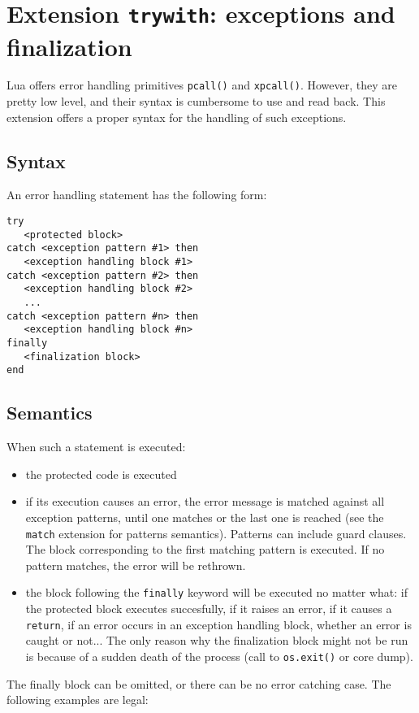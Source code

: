 \section{Extension {\tt trywith}: exceptions and finalization}
Lua offers error handling primitives \verb+pcall()+ and
\verb+xpcall()+. However, they are pretty low level, and their syntax
is cumbersome to use and read back. This extension offers a proper
syntax for the handling of such exceptions.

\subsection{Syntax}
An error handling statement has the following form:

\begin{verbatim}
try
   <protected block>
catch <exception pattern #1> then
   <exception handling block #1>
catch <exception pattern #2> then
   <exception handling block #2>
   ...
catch <exception pattern #n> then
   <exception handling block #n>
finally
   <finalization block>
end
\end{verbatim}

\subsection{Semantics}
When such a statement is executed:
\begin{itemize}
\item the protected code is executed
\item if its execution causes an error, the error message is matched
  against all exception patterns, until one matches or the last one is
  reached (see the \verb+match+ extension for patterns
  semantics). Patterns can include guard clauses. The block
  corresponding to the first matching pattern is executed. If no
  pattern matches, the error will be rethrown.
\item the block following the \verb+finally+ keyword will be executed
  no matter what: if the protected block executes succesfully, if it
  raises an error, if it causes a \verb+return+, if an error occurs in
  an exception handling block, whether an error is caught or
  not... The only reason why the finalization block might not be run
  is because of a sudden death of the process (call to {\tt os.exit()}
  or core dump).
\end{itemize}

The finally block can be omitted, or there can be no error catching
case. The following examples are legal:


